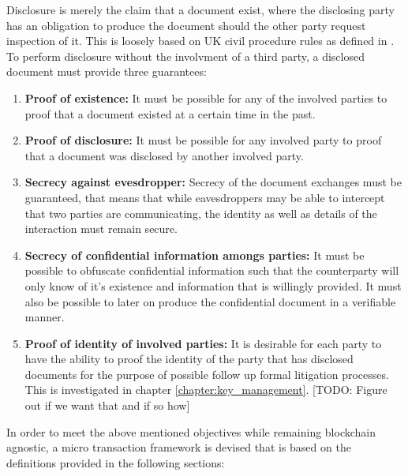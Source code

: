 \documentclass[12pt,msc,a4paper,oneside]{ucl_thesis}
\begin{document}
Disclosure is merely the claim that a document exist, where the disclosing party has an obligation to produce the document should the other party request inspection of it. This is loosely based on UK civil procedure rules as defined in \cite{justice_gov:civil_procedure_rules}. To perform disclosure without the involvment of a third party, a disclosed document must provide three guarantees:
\begin{enumerate}
    \item{\textbf{Proof of existence:}} It must be possible for any of the involved parties to proof that a document existed at a certain time in the past. \label{itm:disclosure_document_objectives_existence}
    
    \item{\textbf{Proof of disclosure:}} It must be possible for any involved party to proof that a document was disclosed by another involved party. \label{itm:disclosure_document_objectives_disclosure}

    \item{\textbf{Secrecy against evesdropper:}} Secrecy of the document exchanges must be guaranteed, that means that while eavesdroppers may be able to intercept that two parties are communicating, the identity as well as details of the interaction must remain secure. \label{itm:disclosure_document_objectives_evesdrop}
   
    \item{\textbf{Secrecy of confidential information amongs parties:}} It must be possible to obfuscate confidential information such that the counterparty will only know of it's existence and information that is willingly provided. It must also be possible to later on produce the confidential document in a verifiable manner. \label{itm:disclosure_document_objectives_confidential}

    \item{\textbf{Proof of identity of involved parties:}} It is desirable for each party to have the ability to proof the identity of the party that has disclosed documents for the purpose of possible follow up formal litigation processes. This is investigated in chapter \ref{chapter:key_management}. [TODO: Figure out if we want that and if so how] \label{itm:disclosure_document_objectives_identification}
\end{enumerate}
In order to meet the above mentioned objectives while remaining blockchain agnostic, a micro transaction framework is devised that is based on the definitions provided in the following sections:
\end{document}
